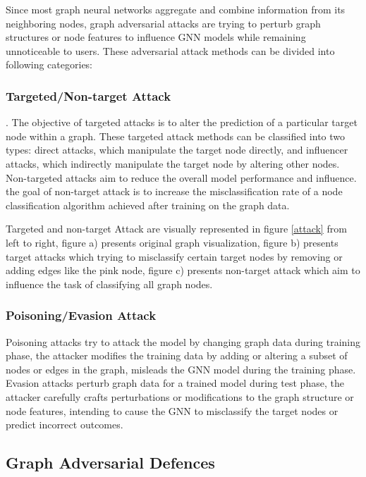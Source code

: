 \documentclass[conference]{IEEEtran}
\begin{document}
Since most graph neural networks aggregate and combine information from its neighboring nodes, graph adversarial attacks are trying to perturb graph structures or node features to influence GNN models while remaining unnoticeable to users. These adversarial attack methods can be divided into following categories:

\subsubsection{Targeted/Non-target Attack}. The objective of targeted attacks \cite{Zgner2018AdversarialAO} is to alter the prediction of a particular target node within a graph. These targeted attack methods can be classified into two types: direct attacks, which manipulate the target node directly, and influencer attacks, which indirectly manipulate the target node by altering other nodes. Non-targeted attacks \cite{Zgner2019AdversarialAO} aim to reduce the overall model performance and influence. the goal of non-target attack is to increase the misclassification rate of a node classification algorithm achieved after training on the graph data.

Targeted and non-target Attack are visually represented in figure \ref{attack} from left to right, figure a) presents original graph visualization, figure b) presents target attacks which trying to misclassify certain target nodes by removing or adding edges like the pink node, figure c) presents non-target attack which aim to influence the task of classifying all graph nodes. 

\subsubsection{Poisoning/Evasion Attack} Poisoning attacks \cite{li2020deeprobust} try to attack the model by changing graph data during training phase, the attacker modifies the training data by adding or altering a subset of nodes or edges in the graph, misleads the GNN model during the training phase. Evasion attacks \cite{li2020deeprobust} perturb graph data for a trained model during test phase, the attacker carefully crafts perturbations or modifications to the graph structure or node features, intending to cause the GNN to misclassify the target nodes or predict incorrect outcomes.


\subsection{Graph Adversarial Defences}
\end{document}
